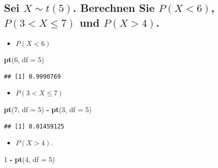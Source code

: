 \documentclass[12pt,a4paper]{article}
\newenvironment{Shaded}{\begin{snugshade}}{\end{snugshade}}
\newcommand{\AttributeTok}[1]{\textcolor[rgb]{0.13,0.29,0.53}{#1}}
\newcommand{\DecValTok}[1]{\textcolor[rgb]{0.00,0.00,0.81}{#1}}
\newcommand{\FunctionTok}[1]{\textcolor[rgb]{0.13,0.29,0.53}{\textbf{#1}}}
\newcommand{\NormalTok}[1]{#1}
\newcommand{\SpecialCharTok}[1]{\textcolor[rgb]{0.81,0.36,0.00}{\textbf{#1}}}
\begin{document}
\subsection{\texorpdfstring{Sei \(X\sim t(5)\). Berechnen Sie
\(P(X<6)\), \(P(3<X\leq7)\) und
\(P(X>4)\).}{Sei X\textbackslash sim t(5). Berechnen Sie P(X\textless6), P(3\textless X\textbackslash leq7) und P(X\textgreater4).}}\label{sei-xsim-t5.-berechnen-sie-px6-p3xleq7-und-px4.}

\begin{itemize}
  \item  $P(X<6)$
\end{itemize}

\begin{Shaded}
\begin{Highlighting}[]
    \FunctionTok{pt}\NormalTok{(}\DecValTok{6}\NormalTok{, }\AttributeTok{df =} \DecValTok{5}\NormalTok{)}
\end{Highlighting}
\end{Shaded}

\begin{verbatim}
## [1] 0.9990769
\end{verbatim}

\begin{itemize}
  \item  $P(3< X \leq 7)$
\end{itemize}

\begin{Shaded}
\begin{Highlighting}[]
    \FunctionTok{pt}\NormalTok{(}\DecValTok{7}\NormalTok{, }\AttributeTok{df =} \DecValTok{5}\NormalTok{) }\SpecialCharTok{{-}} \FunctionTok{pt}\NormalTok{(}\DecValTok{3}\NormalTok{, }\AttributeTok{df =} \DecValTok{5}\NormalTok{)}
\end{Highlighting}
\end{Shaded}

\begin{verbatim}
## [1] 0.01459125
\end{verbatim}

\begin{itemize}
  \item $P(X>4)$.
\end{itemize}

\begin{Shaded}
\begin{Highlighting}[]
    \DecValTok{1} \SpecialCharTok{{-}} \FunctionTok{pt}\NormalTok{(}\DecValTok{4}\NormalTok{, }\AttributeTok{df =} \DecValTok{5}\NormalTok{)}
\end{Highlighting}
\end{Shaded}
\end{document}
